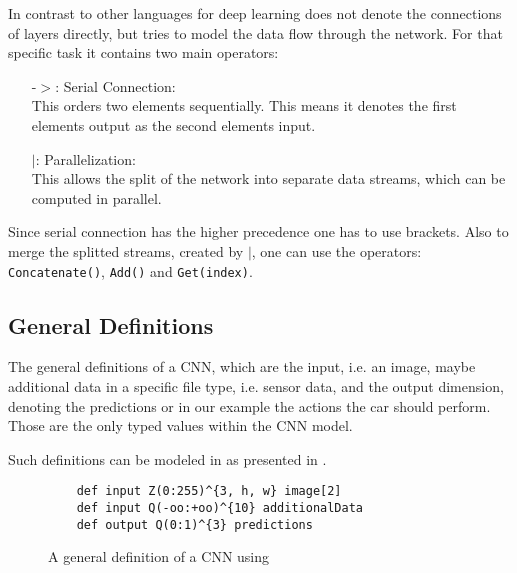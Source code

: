 In contrast to other languages for deep learning \cnnarch does not denote the connections of layers directly, but tries to model the data flow through the network. For that specific task it contains two main operators:
\begin{itemize}
	\item[-$>$:] Serial Connection:\label{item: sequential connection}\\
	This orders two elements sequentially. This means it denotes the first elements output as the second elements input. 
	\item[$|$:] Parallelization:\\
	This allows the split of the network into separate data streams, which can be computed in parallel.
\end{itemize}
Since serial connection has the higher precedence one has to use brackets. Also to merge the splitted streams, created by $|$, one can use the operators: \texttt{Concatenate()}, \texttt{Add()} and \texttt{Get(index)}.

\subsection{General Definitions}\label{subsec: general definitions}
The general definitions of a CNN, which are the input, i.e. an image, maybe additional data in a specific file type, i.e. sensor data, and the output dimension, denoting the predictions or in our example the actions the car should perform. Those are the only typed values within the CNN model.

Such definitions can be modeled in \cnnarch as presented in .

\begin{figure}[H]
	\centering
	\begin{lstlisting}
	def input Z(0:255)^{3, h, w} image[2]
	def input Q(-oo:+oo)^{10} additionalData
	def output Q(0:1)^{3} predictions
	\end{lstlisting}
	\caption{A general definition of a CNN using \cnnarch}
	\label{lst: general definitons CNNArchLang}
\end{figure}

